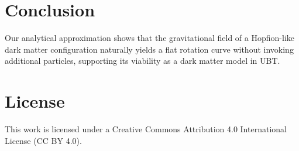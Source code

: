\documentclass[12pt]{article}
\begin{document}
\section*{Conclusion}

Our analytical approximation shows that the gravitational field of a Hopfion-like dark matter configuration naturally yields a flat rotation curve without invoking additional particles, supporting its viability as a dark matter model in UBT.


\section*{License}
This work is licensed under a Creative Commons Attribution 4.0 International License (CC BY 4.0).
\end{document}
